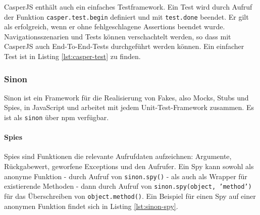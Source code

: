 \begin{figure}[H]
	
\end{figure}

CasperJS enthält auch ein einfaches Testframework. Ein Test wird durch Aufruf der Funktion \texttt{casper.test.begin} definiert und mit \texttt{test.done} beendet. Er gilt als erfolgreich, wenn er ohne fehlgeschlagene Assertions beendet wurde. Navigationsszenarien und Tests können verschachtelt werden, so dass mit CasperJS auch End-To-End-Tests durchgeführt werden können.\cite{casperjs-index, casperjs-test} Ein einfacher Test ist in Listing \ref{lst:casper-test} zu finden.

\begin{figure}[H]
	
\end{figure}


\subsubsection{Sinon}
\label{sec:Sinon}
Sinon ist ein Framework für die Realisierung von Fakes, also Mocks, Stubs und Spies, in JavaScript und arbeitet mit jedem Unit-Test-Framework zusammen. Es ist als \texttt{sinon} über npm verfügbar.\cite{sinonjs-index}

\paragraph*{Spies}
Spies sind Funktionen die relevante Aufrufdaten aufzeichnen: Argumente, Rückgabewert, geworfene Exceptions und den Aufrufer. Ein Spy kann sowohl als anonyme Funktion - durch Aufruf von \texttt{sinon.spy()} - als auch als Wrapper für existierende Methoden - dann durch Aufruf von \texttt{sinon.spy(object, 'method')} für das Überschreiben von \texttt{object.method()}.\cite{sinonjs-spies} Ein Beispiel für einen Spy auf einer anonymen Funktion findet sich in Listing \ref{lst:sinon-spy}.

\begin{figure}[H]
	
\end{figure}

